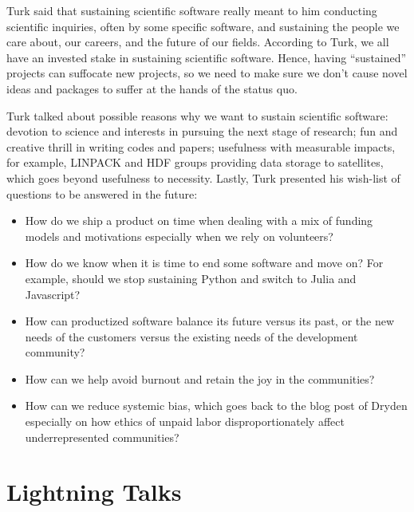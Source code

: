 \documentclass[11pt, oneside]{amsart}
\newcommand{\note}[1]{ {\textcolor{blueish}    { ***Note:      #1 }}}
\begin{document}
Turk said that sustaining scientific software really meant to him conducting
scientific inquiries, often by some specific software, and sustaining the people
we care about, our careers, and the future of our fields. According to Turk, we
all have an invested stake in sustaining scientific software. Hence, having
``sustained'' projects can suffocate new projects, so we need to make sure we
don't cause novel ideas and packages to suffer at the hands of the status quo.


Turk talked about possible reasons why we want to sustain scientific software:
devotion to science and interests in pursuing the next stage of research; fun
and creative thrill in writing codes and papers; usefulness with measurable
impacts, for example, LINPACK and HDF groups providing data storage to
satellites, which goes beyond usefulness to necessity. Lastly, Turk presented
his wish-list of questions to be answered in the future:
%
\begin{itemize} 

\item How do we ship a product on time when dealing with a mix of funding models
and motivations especially when we rely on volunteers?

\item How do we know when it is time to end some software and move on? For
example, should we stop sustaining Python and switch to Julia and Javascript?
 
\item How can productized software balance its future versus its past, or the
new needs of the customers versus the existing needs of the development
community?

\item How can we help avoid burnout and retain the joy in the communities?

\item How can we reduce systemic bias, which goes back to the blog post of
Dryden especially on how ethics of unpaid labor disproportionately affect
underrepresented communities?

\end{itemize}

\section{Lightning Talks} \label{sec:lightning}
\begin{comment}
\note{
\href{http://wssspe.researchcomputing.org.uk/wssspe3/agenda/}{Slides.}}
\end{comment}
\end{document}

